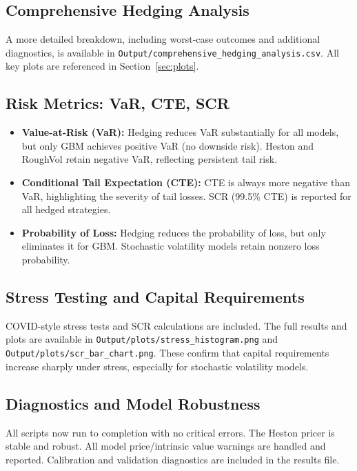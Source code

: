 \documentclass[12pt,a4paper]{report}
\begin{document}
\subsection{Comprehensive Hedging Analysis}

A more detailed breakdown, including worst-case outcomes and additional diagnostics, is available in \texttt{Output/comprehensive\_hedging\_analysis.csv}. All key plots are referenced in Section~\ref{sec:plots}.

\subsection{Risk Metrics: VaR, CTE, SCR}

\begin{itemize}
    \item \textbf{Value-at-Risk (VaR):} Hedging reduces VaR substantially for all models, but only GBM achieves positive VaR (no downside risk). Heston and RoughVol retain negative VaR, reflecting persistent tail risk.
    \item \textbf{Conditional Tail Expectation (CTE):} CTE is always more negative than VaR, highlighting the severity of tail losses. SCR (99.5\% CTE) is reported for all hedged strategies.
    \item \textbf{Probability of Loss:} Hedging reduces the probability of loss, but only eliminates it for GBM. Stochastic volatility models retain nonzero loss probability.
\end{itemize}

\subsection{Stress Testing and Capital Requirements}

COVID-style stress tests and SCR calculations are included. The full results and plots are available in \texttt{Output/plots/stress\_histogram.png} and \texttt{Output/plots/scr\_bar\_chart.png}. These confirm that capital requirements increase sharply under stress, especially for stochastic volatility models.

\subsection{Diagnostics and Model Robustness}

All scripts now run to completion with no critical errors. The Heston pricer is stable and robust. All model price/intrinsic value warnings are handled and reported. Calibration and validation diagnostics are included in the results file.
\end{document}
